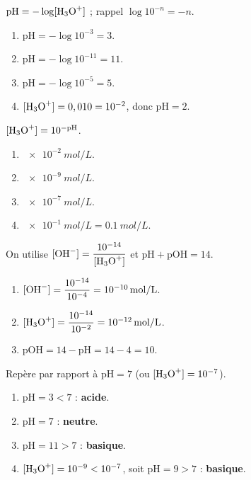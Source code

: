 \documentclass[11pt,a4paper]{article}
\begin{document}

\begin{corrige}[de la concentration au pH]
$\mathrm{pH} = -\log[\ce{H3O+}]$ ; rappel $\log 10^{-n} = -n$.
\begin{enumerate}[label=\alph*)]
  \item $\mathrm{pH} = -\log 10^{-3} = 3$.
  \item $\mathrm{pH} = -\log 10^{-11} = 11$.
  \item $\mathrm{pH} = -\log 10^{-5} = 5$.
  \item $[\ce{H3O+}] = 0,010 = 10^{-2}$, donc $\mathrm{pH} = 2$.
\end{enumerate}
\end{corrige}

\begin{corrige}[du pH à la concentration]
$[\ce{H3O+}] = 10^{-\mathrm{pH}}$.
\begin{enumerate}[label=\alph*)]
  \item $\qty{e-2}{mol\per L}$.
  \item $\qty{e-9}{mol\per L}$.
  \item $\qty{e-7}{mol\per L}$.
  \item $\qty{e-1}{mol\per L} = \qty{0,1}{mol\per L}$.
\end{enumerate}
\end{corrige}

\begin{corrige}
On utilise $[\ce{OH-}] = \dfrac{10^{-14}}{[\ce{H3O+}]}$ et $\mathrm{pH}+\mathrm{pOH}=14$.
\begin{enumerate}[label=\alph*)]
  \item $[\ce{OH-}] = \dfrac{10^{-14}}{10^{-4}} = \qty{e-10}{mol\per L}$.
  \item $[\ce{H3O+}] = \dfrac{10^{-14}}{10^{-2}} = \qty{e-12}{mol\per L}$.
  \item $\mathrm{pOH} = 14 - \mathrm{pH} = 14 - 4 = 10$.
\end{enumerate}
\end{corrige}

\begin{corrige}
Repère par rapport à $\mathrm{pH}=7$ (ou $[\ce{H3O+}]=10^{-7}$).
\begin{enumerate}[label=\alph*)]
  \item $\mathrm{pH}=3 < 7$ : \textbf{acide}.
  \item $\mathrm{pH}=7$ : \textbf{neutre}.
  \item $\mathrm{pH}=11 > 7$ : \textbf{basique}.
  \item $[\ce{H3O+}]=10^{-9} < 10^{-7}$, soit $\mathrm{pH}=9 > 7$ : \textbf{basique}.
\end{enumerate}
\end{corrige}
\end{document}
